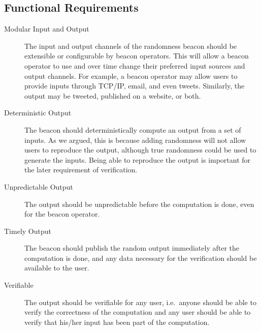 \subsection{Functional Requirements}
\label{sub:functional_requirements}
\begin{description}
    \item[Modular Input and Output]
The input and output channels of the randomness beacon should be extensible or configurable by beacon operators.
This will allow a beacon operator to use and over time change their preferred input sources and output channels.
For example, a beacon operator may allow users to provide inputs through TCP/IP, email, and even tweets.
Similarly, the output may be tweeted, published on a website, or both.


    \item[Deterministic Output]
The beacon should deterministically compute an output from a set of inputs.
As we argued, this is because adding randomness will not allow users to reproduce the output, although true randomness could be used to generate the inputs. 
Being able to reproduce the output is important for the later requirement of verification. 


    \item[Unpredictable Output]
The output should be unpredictable before the computation is done, even for the beacon operator.


    \item[Timely Output]
The beacon should publish the random output immediately after the computation is done, and any data necessary for the verification should be available to the user.

    \item[Verifiable]
The output should be verifiable for any user, i.e.\ anyone should be able to verify the correctness of the computation and any user should be able to verify that his/her input has been part of the computation.
\end{description}

